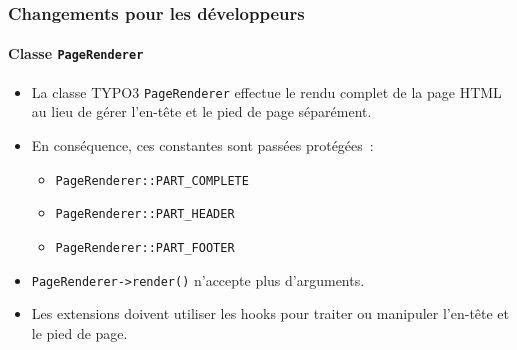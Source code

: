 %

\begin{frame}[fragile]
	\frametitle{Changements pour les développeurs}
	\framesubtitle{Classe \texttt{PageRenderer}}

	\begin{itemize}
		\item La classe TYPO3 \small\texttt{PageRenderer}\normalsize
			effectue le rendu complet de la page HTML au lieu de gérer l'en-tête et
			le pied de page séparément.

		\item En conséquence, ces constantes sont passées protégées~:

			\begin{itemize}\small
				\item \texttt{PageRenderer::PART\_COMPLETE}
				\item \texttt{PageRenderer::PART\_HEADER}
				\item \texttt{PageRenderer::PART\_FOOTER}
			\end{itemize}

		\item \texttt{PageRenderer->render()} n'accepte plus d'arguments.

		\item Les extensions doivent utiliser les hooks pour traiter ou manipuler
			l'en-tête et le pied de page.

	\end{itemize}
\end{frame}

